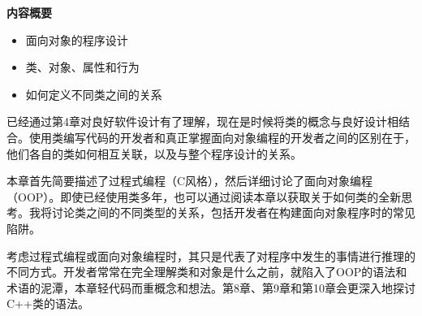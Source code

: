 \noindent
\textbf{内容概要}

\begin{itemize}
\item
面向对象的程序设计

\item
类、对象、属性和行为

\item
如何定义不同类之间的关系
\end{itemize}

已经通过第4章对良好软件设计有了理解，现在是时候将类的概念与良好设计相结合。使用类编写代码的开发者和真正掌握面向对象编程的开发者之间的区别在于，他们各自的类如何相互关联，以及与整个程序设计的关系。

本章首先简要描述了过程式编程（C风格），然后详细讨论了面向对象编程（OOP）。即使已经使用类多年，也可以通过阅读本章以获取关于如何类的全新思考。我将讨论类之间的不同类型的关系，包括开发者在构建面向对象程序时的常见陷阱。

考虑过程式编程或面向对象编程时，其只是代表了对程序中发生的事情进行推理的不同方式。开发者常常在完全理解类和对象是什么之前，就陷入了OOP的语法和术语的泥潭，本章轻代码而重概念和想法。第8章、第9章和第10章会更深入地探讨C++类的语法。















